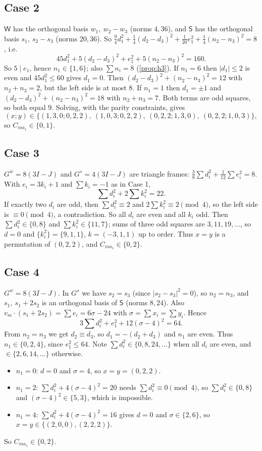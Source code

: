 \documentclass[11pt,a4paper]{amsart}
\theoremstyle{definition}
\theoremstyle{remark}
\begin{document}
\subsection*{Case 2} $\mathsf W$ has the orthogonal basis $w_1,\ w_2-w_3$ (norms $4,36$), and $\mathsf S$
has the orthogonal basis $s_1,\ s_2-s_3$ (norms $20,36$). So
$\frac94d_1^2+\frac14(d_2-d_3)^2+\frac1{20}e_1^2+\frac14(n_2-n_3)^2=8$, i.e.
\[
45d_1^2+5(d_2-d_3)^2+e_1^2+5(n_2-n_3)^2=160 .
\]
So $5\mid e_1$, hence $n_1\in\{1,6\}$; also $\sum n_i=8$ (\cref{prop:h3}). If $n_1=6$ then $|d_1|\le2$ is even
and $45d_1^2\le 60$ gives $d_1=0$. Then $(d_2-d_3)^2+(n_2-n_3)^2=12$ with $n_2+n_3=2$, but the left side
is at most $8$. If $n_1=1$ then $d_1=\pm1$ and $(d_2-d_3)^2+(n_2-n_3)^2=18$ with $n_2+n_3=7$. Both terms
are odd squares, so both equal $9$. Solving, with the parity constraints, gives
\[
(x;y)\in\{(1,3,0;0,2,2),\ (1,0,3;0,2,2),\ (0,2,2;1,3,0),\ (0,2,2;1,0,3)\},
\]
so $C_{ma_1}\in\{0,1\}$.

\subsection*{Case 3} $G^w=8(3I-J)$ and $G^s=4(3I-J)$ are triangle frames:
$\frac38\sum d_i^2+\frac1{12}\sum e_i^2=8$. With $e_i=3k_i+1$ and $\sum k_i=-1$ as in Case 1,
\[
\textstyle\sum d_i^2+2\sum k_i^2=22 .
\]
If exactly two $d_i$ are odd, then $\sum d_i^2\equiv2$ and $2\sum k_i^2\equiv2\pmod4$, so the left side
is $\equiv0\pmod 4$, a contradiction. So all $d_i$ are even and all $k_i$ odd. Then $\sum d_i^2\in\{0,8\}$
and $\sum k_i^2\in\{11,7\}$; sums of three odd squares are $3,11,19,\dots$, so $d=0$ and
$\{k_i^2\}=\{9,1,1\}$, $k=(-3,1,1)$ up to order. Thus $x=y$ is a permutation of $(0,2,2)$, and
$C_{ma_1}\in\{0,2\}$.

\subsection*{Case 4} $G^w=8(3I-J)$. In $G^s$ we have $s_2=s_3$ (since $|s_2-s_3|^2=0$), so $n_2=n_3$, and
$s_1,\ s_1+2s_2$ is an orthogonal basis of $\mathsf S$ (norms $8,24$). Also
$v_m\cdot(s_1+2s_2)=\sum e_i=6\sigma-24$ with $\sigma=\sum x_i=\sum y_i$. Hence
\[
3\textstyle\sum d_i^2+e_1^2+12(\sigma-4)^2=64 .
\]
From $n_2=n_3$ we get $d_2\equiv d_3$, so $d_1=-(d_2+d_3)$ and $n_1$ are even. Thus $n_1\in\{0,2,4\}$, since
$e_1^2\le64$. Note $\sum d_i^2\in\{0,8,24,\dots\}$ when all $d_i$ are even, and $\in\{2,6,14,\dots\}$
otherwise.
\begin{itemize}[leftmargin=2em]
\item $n_1=0$: $d=0$ and $\sigma=4$, so $x=y=(0,2,2)$.
\item $n_1=2$: $\sum d_i^2+4(\sigma-4)^2=20$ needs $\sum d_i^2\equiv0\pmod4$, so $\sum d_i^2\in\{0,8\}$ and
$(\sigma-4)^2\in\{5,3\}$, which is impossible.
\item $n_1=4$: $\sum d_i^2+4(\sigma-4)^2=16$ gives $d=0$ and $\sigma\in\{2,6\}$, so $x=y\in\{(2,0,0),(2,2,2)\}$.
\end{itemize}
So $C_{ma_1}\in\{0,2\}$.
\end{document}
